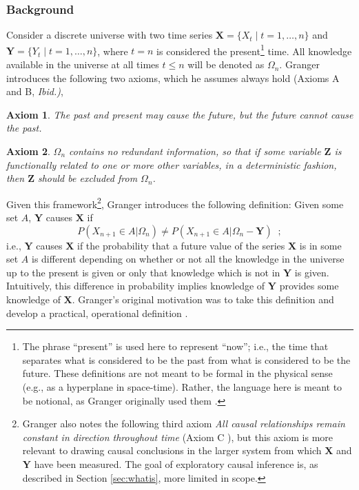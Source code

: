 \documentclass{article}[10pt]
\newtheorem{ax}{Axiom}[section]
\begin{document}
\subsubsection{Background}
\label{sec:GCback}
Consider a discrete universe with two time series $\mathbf{X}=\{X_t\;|\; t=1,\ldots,n\}$ and $\mathbf{Y}=\{Y_t\;|\; t=1,\ldots,n\}$, where $t=n$ is considered the present\footnote{The phrase ``present'' is used here to represent ``now''; i.e., the time that separates what is considered to be the past from what is considered to be the future.  These definitions are not meant to be formal in the physical sense (e.g., as a hyperplane in space-time).  Rather, the language here is meant to be notional, as Granger originally used them \cite{Granger1980}.} time.  All knowledge available in the universe at all times $t\le n$ will be denoted as $\Omega_n$.  Granger introduces the following two axioms, which he assumes always hold \cite{Granger1980} (Axioms A and B, {\em Ibid.)},
\begin{ax}
The past and present may cause the future, but the future cannot cause the past. 
\end{ax}
\begin{ax}
$\Omega_n$ contains no redundant information, so that if some variable $\mathbf{Z}$ is functionally related to one or more other variables, in a deterministic fashion, then $\mathbf{Z}$ should be excluded from $\Omega_n$. 
\end{ax}

Given this framework\footnote{Granger also notes the following third axiom {\em All causal relationships remain constant in direction throughout time} (Axiom C \cite{Granger1980}), but this axiom is more relevant to drawing causal conclusions in the larger system from which $\mathbf{X}$ and $\mathbf{Y}$ have been measured.  The goal of exploratory causal inference is, as described in Section \ref{sec:whatis}, more limited in scope.}, Granger introduces the following definition: Given some set $A$, $\mathbf{Y}$ causes $\mathbf{X}$ if
\begin{equation}
\label{eq:GCdef}
P(X_{n+1}\in A|\Omega_n) \neq P(X_{n+1}\in A|\Omega_n-\mathbf{Y})\;\;;
\end{equation}
i.e., $\mathbf{Y}$ causes $\mathbf{X}$ if the probability that a future value of the series $\mathbf{X}$ is in some set $A$ is different depending on whether or not all the knowledge in the universe up to the present is given or only that knowledge which is not in $\mathbf{Y}$ is given.  Intuitively, this difference in probability implies knowledge of $\mathbf{Y}$ provides some knowledge of $\mathbf{X}$.  Granger's original motivation was to take this definition and develop a practical, operational definition \cite{Granger1980,Granger1969,Granger1963,Granger1988}.
\end{document}
